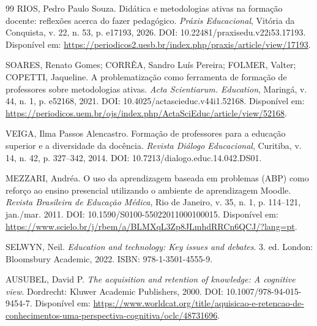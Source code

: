 \begin{thebibliography}{99}
RIOS, Pedro Paulo Souza. Didática e metodologias ativas na formação docente: reflexões acerca do fazer pedagógico. \textit{Práxis Educacional}, Vitória da Conquista, v. 22, n. 53, p. e17193, 2026. DOI: 10.22481/praxisedu.v22i53.17193. Disponível em: \url{https://periodicos2.uesb.br/index.php/praxis/article/view/17193}.

SOARES, Renato Gomes; CORRÊA, Sandro Luís Pereira; FOLMER, Valter; COPETTI, Jaqueline. A problematização como ferramenta de formação de professores sobre metodologias ativas. \textit{Acta Scientiarum. Education}, Maringá, v. 44, n. 1, p. e52168, 2021. DOI: 10.4025/actascieduc.v44i1.52168. Disponível em: \url{https://periodicos.uem.br/ojs/index.php/ActaSciEduc/article/view/52168}.

VEIGA, Ilma Passos Alencastro. Formação de professores para a educação superior e a diversidade da docência. \textit{Revista Diálogo Educacional}, Curitiba, v. 14, n. 42, p. 327--342, 2014. DOI: 10.7213/dialogo.educ.14.042.DS01.


MEZZARI, Andréa. O uso da aprendizagem baseada em problemas (ABP) como reforço ao ensino presencial utilizando o ambiente de aprendizagem Moodle. \textit{Revista Brasileira de Educação Médica}, Rio de Janeiro, v. 35, n. 1, p. 114--121, jan./mar. 2011. DOI: 10.1590/S0100-55022011000100015. Disponível em: \url{https://www.scielo.br/j/rbem/a/BLMXqL3Zp8JLmhdRRCn6QCJ/?lang=pt}.

SELWYN, Neil. \textit{Education and technology: Key issues and debates}. 3. ed. London: Bloomsbury Academic, 2022. ISBN: 978-1-3501-4555-9.


AUSUBEL, David P. \textit{The acquisition and retention of knowledge: A cognitive view}. Dordrecht: Kluwer Academic Publishers, 2000. DOI: 10.1007/978-94-015-9454-7. Disponível em: \url{https://www.worldcat.org/title/aquisicao-e-retencao-de-conhecimentos-uma-perspectiva-cognitiva/oclc/48731696}.


\end{thebibliography}

